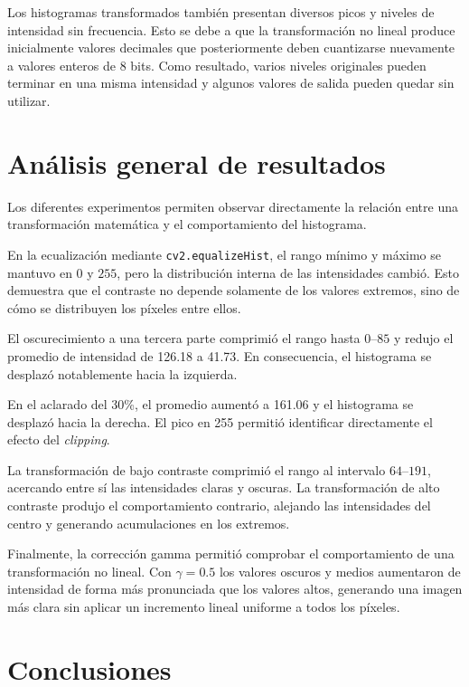 \documentclass[11pt,letterpaper]{article}
\begin{document}
Los histogramas transformados también presentan diversos picos y niveles de intensidad sin frecuencia. Esto se debe a que la transformación no lineal produce inicialmente valores decimales que posteriormente deben cuantizarse nuevamente a valores enteros de 8 bits. Como resultado, varios niveles originales pueden terminar en una misma intensidad y algunos valores de salida pueden quedar sin utilizar.


\section{Análisis general de resultados}

Los diferentes experimentos permiten observar directamente la relación entre una transformación matemática y el comportamiento del histograma.

En la ecualización mediante \texttt{cv2.equalizeHist}, el rango mínimo y máximo se mantuvo en $0$ y $255$, pero la distribución interna de las intensidades cambió. Esto demuestra que el contraste no depende solamente de los valores extremos, sino de cómo se distribuyen los píxeles entre ellos.

El oscurecimiento a una tercera parte comprimió el rango hasta $0$--$85$ y redujo el promedio de intensidad de 126.18 a 41.73. En consecuencia, el histograma se desplazó notablemente hacia la izquierda.

En el aclarado del 30\%, el promedio aumentó a 161.06 y el histograma se desplazó hacia la derecha. El pico en 255 permitió identificar directamente el efecto del \textit{clipping}.

La transformación de bajo contraste comprimió el rango al intervalo $64$--$191$, acercando entre sí las intensidades claras y oscuras. La transformación de alto contraste produjo el comportamiento contrario, alejando las intensidades del centro y generando acumulaciones en los extremos.

Finalmente, la corrección gamma permitió comprobar el comportamiento de una transformación no lineal. Con $\gamma=0.5$ los valores oscuros y medios aumentaron de intensidad de forma más pronunciada que los valores altos, generando una imagen más clara sin aplicar un incremento lineal uniforme a todos los píxeles.


\section{Conclusiones}
\end{document}
